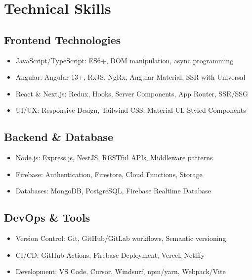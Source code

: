 \documentclass[11pt,a4paper]{article}
\begin{document}
\section*{Technical Skills}

\subsection*{Frontend Technologies}
\begin{itemize}
    \item JavaScript/TypeScript: ES6+, DOM manipulation, async programming
    \item Angular: Angular 13+, RxJS, NgRx, Angular Material, SSR with Universal
    \item React \& Next.js: Redux, Hooks, Server Components, App Router, SSR/SSG
    \item UI/UX: Responsive Design, Tailwind CSS, Material-UI, Styled Components
\end{itemize}

\subsection*{Backend \& Database}
\begin{itemize}
    \item Node.js: Express.js, NestJS, RESTful APIs, Middleware patterns
    \item Firebase: Authentication, Firestore, Cloud Functions, Storage
    \item Databases: MongoDB, PostgreSQL, Firebase Realtime Database
\end{itemize}

\subsection*{DevOps \& Tools}
\begin{itemize}
    \item Version Control: Git, GitHub/GitLab workflows, Semantic versioning
    \item CI/CD: GitHub Actions, Firebase Deployment, Vercel, Netlify
    \item Development: VS Code, Cursor, Windsurf, npm/yarn, Webpack/Vite
\end{itemize}
\end{document}
